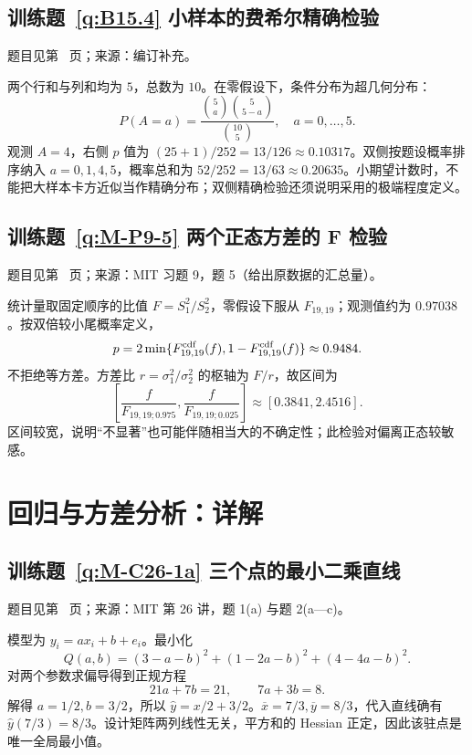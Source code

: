 \subsection*{训练题~\ref{q:B15.4} 小样本的费希尔精确检验}\label{a:B15.4}{\small 题目见第~\pageref{q:B15.4} 页；来源：编订补充。}
\begin{solve}两个行和与列和均为 $5$，总数为 $10$。在零假设下，条件分布为超几何分布：\[P(A=a)=\frac{\binom5a\binom5{5-a}}{\binom{10}5},\quad a=0,\ldots,5.\]观测 $A=4$，右侧 $p$ 值为 $(25+1)/252=13/126\approx0.10317$。双侧按题设概率排序纳入 $a=0,1,4,5$，概率总和为 $52/252=13/63\approx0.20635$。小期望计数时，不能把大样本卡方近似当作精确分布；双侧精确检验还须说明采用的极端程度定义。\end{solve}

\subsection*{训练题~\ref{q:M-P9-5} 两个正态方差的 F 检验}\label{a:M-P9-5}{\small 题目见第~\pageref{q:M-P9-5} 页；来源：MIT 习题 9，题 5（给出原数据的汇总量）。}
\begin{solve}统计量取固定顺序的比值 $F=S_1^2/S_2^2$，零假设下服从 $F_{19,19}$；观测值约为 $0.97038$。按双倍较小尾概率定义，\[p=2\min\{F_{19,19}^{\rm cdf}(f),1-F_{19,19}^{\rm cdf}(f)\}\approx0.9484.\]不拒绝等方差。方差比 $r=\sigma_1^2/\sigma_2^2$ 的枢轴为 $F/r$，故区间为\[\left[\frac{f}{F_{19,19;0.975}},\frac{f}{F_{19,19;0.025}}\right]\approx[0.3841,2.4516].\]区间较宽，说明“不显著”也可能伴随相当大的不确定性；此检验对偏离正态较敏感。\end{solve}

\clearpage\section*{回归与方差分析：详解}

\subsection*{训练题~\ref{q:M-C26-1a} 三个点的最小二乘直线}\label{a:M-C26-1a}{\small 题目见第~\pageref{q:M-C26-1a} 页；来源：MIT 第 26 讲，题 1(a) 与题 2(a—c)。}
\begin{solve}模型为 $y_i=a x_i+b+e_i$。最小化\[Q(a,b)=(3-a-b)^2+(1-2a-b)^2+(4-4a-b)^2.\]对两个参数求偏导得到正规方程\[21a+7b=21,\qquad7a+3b=8.\]解得 $a=1/2,b=3/2$，所以 $\widehat y=x/2+3/2$。$\overline x=7/3,\overline y=8/3$，代入直线确有 $\widehat y(7/3)=8/3$。设计矩阵两列线性无关，平方和的 Hessian 正定，因此该驻点是唯一全局最小值。\end{solve}

